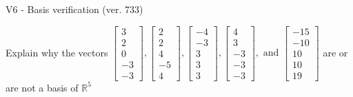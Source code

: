 \begin{exercise}
  \begin{exerciseTitle}V6 - Basis verification (ver. 733)\end{exerciseTitle}
  \begin{exerciseStatement}
    Explain why the vectors \(\left[\begin{array}{r}
3 \\
2 \\
0 \\
-3 \\
-3
\end{array}\right] , \left[\begin{array}{r}
2 \\
2 \\
4 \\
-5 \\
4
\end{array}\right] , \left[\begin{array}{r}
-4 \\
-3 \\
3 \\
3 \\
3
\end{array}\right] , \left[\begin{array}{r}
4 \\
3 \\
-3 \\
-3 \\
-3
\end{array}\right] , \text{ and } \left[\begin{array}{r}
-15 \\
-10 \\
10 \\
10 \\
19
\end{array}\right]\) are or are not a basis of \(\mathbb{R}^5\)	



\end{exerciseStatement}
\end{exercise}

